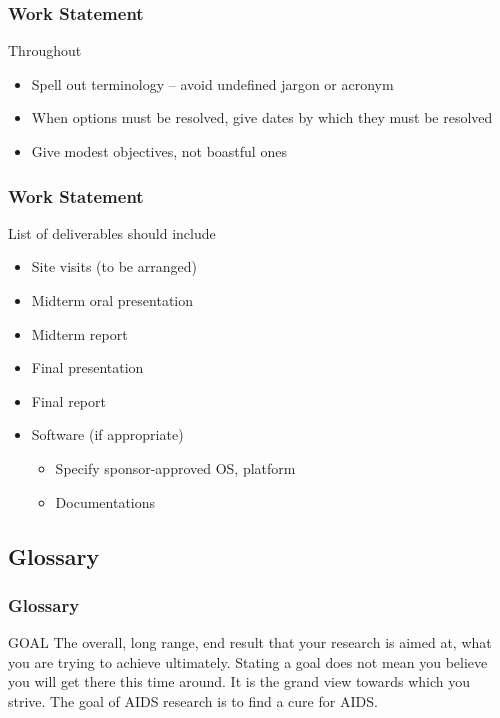 \begin{frame}
    \frametitle{Work Statement}
    \begin{block}
        {Throughout}
        \begin{itemize}
            \item Spell out terminology -- avoid undefined jargon or acronym
            \item When options must be resolved, give dates by which they must
                be resolved
            \item Give modest objectives, not boastful ones
        \end{itemize}
    \end{block}
\end{frame}

\begin{frame}
    \frametitle{Work Statement}
    \begin{block}
        {List of deliverables should include}
        \begin{itemize}
            \item Site visits (to be arranged)
            \item Midterm oral presentation
            \item Midterm report
            \item Final presentation
            \item Final report
            \item Software (if appropriate) 
                \begin{itemize}
                    \item Specify sponsor-approved OS, platform
                    \item Documentations
                \end{itemize}
        \end{itemize}
    \end{block}
\end{frame}

\subsection{Glossary}

\begin{frame}[allowframebreaks]
    \frametitle{Glossary}
    \begin{block}
        {GOAL} The overall, long range, end result that your research is aimed at, what
you are trying to achieve ultimately. Stating a goal does not mean you believe
you will get there this time around. It is the grand view towards which you
strive. The goal of AIDS research is to find a cure for AIDS.
\end{block}
\end{frame}

